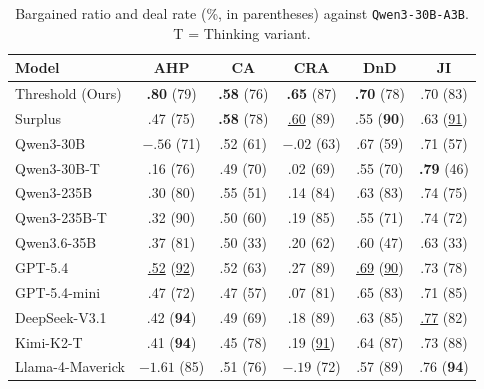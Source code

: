 \documentclass[11pt]{article}
\newcommand{\model}[1]{\texttt{#1}}
\newcommand{\lightrule}{\arrayrulecolor{black!20}\midrule\arrayrulecolor{black}}
\begin{document}
\begin{table}[t]
\centering
\scriptsize
\setlength{\tabcolsep}{3pt}
\renewcommand{\arraystretch}{1.15}
\begin{tabular}{l c c c c c}
\toprule
\rowcolor{tableheader}
\textbf{Model} & \textbf{AHP} & \textbf{CA} & \textbf{CRA} & \textbf{DnD} & \textbf{JI} \\
\midrule
\rowcolor{tablerow}
Threshold (Ours) & \textbf{.80} (79) & \textbf{.58} (76) & \textbf{.65} (87) & \textbf{.70} (78) & .70 (83) \\
Surplus  & .47 (75)          & \textbf{.58} (78) & \underline{.60} (89) & .55 (\textbf{90}) & .63 (\underline{91}) \\
\lightrule
\rowcolor{tablerow}
Qwen3-30B        & $-.56$ (71)       & .52 (61)          & $-.02$ (63)       & .67 (59)          & .71 (57)          \\
Qwen3-30B-T      & .16 (76)          & .49 (70)          & .02 (69)          & .55 (70)          & \textbf{.79} (46) \\
\rowcolor{tablerow}
Qwen3-235B       & .30 (80)          & .55 (51)          & .14 (84)          & .63 (83)          & .74 (75)          \\
Qwen3-235B-T     & .32 (90)          & .50 (60)          & .19 (85)          & .55 (71)          & .74 (72)          \\
\rowcolor{tablerow}
Qwen3.6-35B      & .37 (81)          & .50 (33)          & .20 (62)          & .60 (47)          & .63 (33)          \\
GPT-5.4          & \underline{.52} (\underline{92}) & .52 (63) & .27 (89) & \underline{.69} (\underline{90}) & .73 (78) \\
\rowcolor{tablerow}
GPT-5.4-mini     & .47 (72)          & .47 (57)          & .07 (81)          & .65 (83)          & .71 (85)          \\
DeepSeek-V3.1    & .42 (\textbf{94}) & .49 (69)          & .18 (89)          & .63 (85)          & \underline{.77} (82) \\
\rowcolor{tablerow}
Kimi-K2-T        & .41 (\textbf{94}) & .45 (78)          & .19 (\underline{91}) & .64 (87)       & .73 (88)          \\
Llama-4-Maverick      & $-1.61$ (85)      & .51 (76)          & $-.19$ (72)       & .57 (89)          & .76 (\textbf{94}) \\
\bottomrule
\end{tabular}

\caption{Bargained ratio and deal rate (\%, in parentheses) against \model{Qwen3-30B-A3B}. T = Thinking variant.}
\label{tab:results-qwen}
\end{table}
\end{document}

